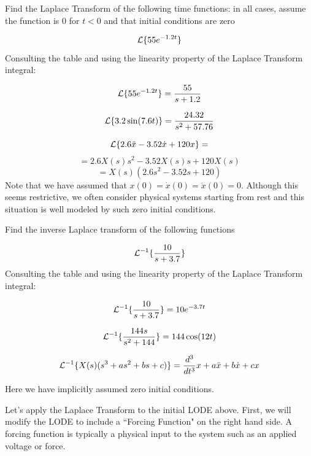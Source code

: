 \begin{ExampleSmall}
Find the Laplace Transform of the following time functions:  in all cases, assume the function is $0$ for $t<0$ and that initial conditions are zero

\vspace{0.2in}

\[
\mathcal{L}\{55e^{-1.2t}\}
\]
Consulting the table and using the linearity property of the Laplace Transform integral:

\[
\mathcal{L}\{55e^{-1.2t}\} = \frac {55} {s+1.2}
\]

\vspace{0.2in}

\[
\mathcal{L}\{ 3.2\sin(7.6t) \} = \frac {24.32}{s^2 + 57.76}
\]
\vspace{0.2in}


\[
\mathcal{L}\{ 2.6\ddot{x} - 3.52\dot{x} + 120x \} =
\]
\[
= 2.6X(s)s^2-3.52X(s)s+120X(s)
\]
\[
= X(s) \left(2.6s^2 - 3.52s + 120 \right)
\]
Note that we have assumed that $x(0) = \dot{x}(0) = \ddot{x}(0) = 0$.   Although this seems restrictive, we often consider physical systems starting from rest and this situation is well modeled by such zero initial conditions.
\end{ExampleSmall}


\begin{ExampleSmall}
Find the inverse Laplace transform of the following functions

\vspace{0.2in}

\[
\mathcal{L}^{-1}\{\frac{10}{s+3.7}  \}
\]
Consulting the table and using the linearity property of the Laplace Transform integral:


\[
\mathcal{L}^{-1}\{\frac{10}{s+3.7}  \}  = 10e^{-3.7t}
\]
\vspace{0.2in}


\[
\mathcal{L}^{-1}\{ \frac{144s}{s^2 + 144} \}  = 144\cos(12t)
\]

\vspace{0.2in}


\[
\mathcal{L}^{-1}\{ X(s)(s^3 + as^2 + bs+c) \} = \frac{d^3}{dt^3}x + a\ddot{x} + b\dot{x} + cx
\]

Here we have implicitly assumed zero initial conditions.

\end{ExampleSmall}


Let's apply the Laplace Transform to the initial LODE above.  First, we will modify the LODE to include a ``Forcing Function" on the right hand side.  A forcing function is typically a physical input to the system such as an applied voltage or force.


